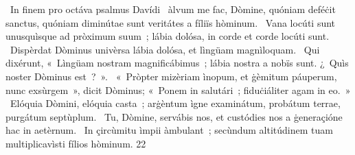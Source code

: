 {~In finem pro octáva psalmus Davídi}
{%
~àlvum me fac, Dòmine, quóniam deféċit sanctus, quóniam diminútae sunt veritátes a fíliïs hòminum.
~Vana locúti sunt unusquìsque ad pròximum suum~; lábia dolósa, in corde et corde locúti sunt.
~Dispèrdat Dòminus univèrsa lábia dolósa, et lìngüam magnìloquam.
~Qui dixérunt, «~Lìngüam nostram magnificábimus~; lábia nostra a nobïs sunt. ¿~Quìs noster Dòminus est~?~».
~«~Pròpter mizèriam ìnopum, et ġèmitum páuperum, nunc exsùrgem~», dicit Dòminus; «~Ponem in salutári~; fiduċiáliter agam in eo.~»
~Elóquia Dòmini, elóquia casta~; arġèntum ìgne examinátum, probátum terrae, purgátum septùplum.
~Tu, Dòmine, servábis nos, et custódies nos a ġeneraçióne hac in aetèrnum.
~In çircùmitu ìmpii àmbulant~; secùndum altitúdinem tuam multiplicavìsti fílios hòminum.
}
{2}{2}
